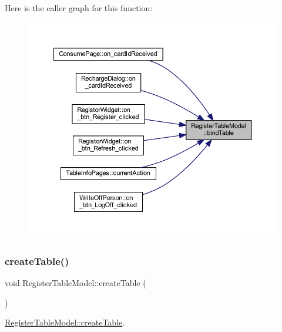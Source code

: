 Here is the caller graph for this function\+:
\nopagebreak
\begin{figure}[H]
\begin{center}
\leavevmode
\includegraphics[width=350pt]{class_register_table_model_ac5551b9d80a8b16c69007ecd39a0cbf9_icgraph}
\end{center}
\end{figure}
\mbox{\label{class_register_table_model_ace2abb791a29dcb909072d1a038b8241}} 
\subsubsection{\texorpdfstring{createTable()}{createTable()}}
{\footnotesize\ttfamily void Register\+Table\+Model\+::create\+Table (\begin{DoxyParamCaption}{ }\end{DoxyParamCaption})}



\mbox{\hyperlink{class_register_table_model_ace2abb791a29dcb909072d1a038b8241}{Register\+Table\+Model\+::create\+Table}}. 


